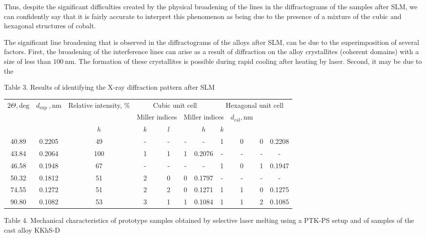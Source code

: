 \documentclass[10pt]{article}
\begin{document}
Thus, despite the significant difficulties created by the physical broadening of the lines in the diffractograms of the samples after SLM, we can confidently say that it is fairly accurate to interpret this phenomenon as being due to the presence of a mixture of the cubic and hexagonal structures of cobalt.

The significant line broadening that is observed in the diffractograms of the alloys after SLM, can be due to the superimposition of several factors. First, the broadening of the interference lines can arise as a result of diffraction on the alloy crystallites (coherent domains) with a size of less than $100 \mathrm{~nm}$. The formation of these crystallites is possible during rapid cooling after heating by laser. Second, it may be due to the

Table 3. Results of identifying the X-ray diffraction pattern after SLM

\begin{center}
\begin{tabular}{c|c|c|c|c|c|c|c|c|c|c}
\hline
\multirow{2}{*}{$2 \Theta, \mathrm{deg}$} & \multirow{2}{*}{$d_{\text {exp }}, \mathrm{nm}$} & \multirow{2}{*}{Relative intensity, $\%$} & \multicolumn{4}{|c|}{Cubic unit cell} & \multicolumn{4}{|c}{Hexagonal unit cell} \\
\cline { 4 - 8 }
 &  &  & \multicolumn{2}{|c|}{Miller indices} & \multicolumn{3}{|c}{Miller indices} & \multirow{2}{*}{$d_{\mathrm{cal}}, \mathrm{nm}$} &  &  \\
\cline { 3 - 8 }\cline { 5 - 8 }
 &  & $h$ & $k$ & $l$ &  & $h$ & $k$ &  &  &  \\
\hline
40.89 & 0.2205 & 49 & - & - & - & - & 1 & 0 & 0 & 0.2208 \\
43.84 & 0.2064 & 100 & 1 & 1 & 1 & 0.2076 & - & - & - & - \\
46.58 & 0.1948 & 67 & - & - & - & - & 1 & 0 & 1 & 0.1947 \\
50.32 & 0.1812 & 51 & 2 & 0 & 0 & 0.1797 & - & - & - & - \\
74.55 & 0.1272 & 51 & 2 & 2 & 0 & 0.1271 & 1 & 1 & 0 & 0.1275 \\
90.80 & 0.1082 & 53 & 3 & 1 & 1 & 0.1084 & 1 & 1 & 2 & 0.1085 \\
\hline
\end{tabular}
\end{center}

Table 4. Mechanical characteristics of prototype samples obtained by selective laser melting using a PTK-PS setup and of samples of the cast alloy KKhS-D
\end{document}
